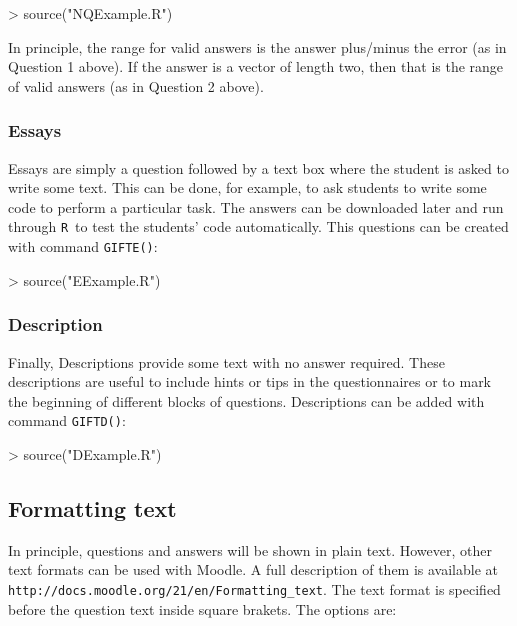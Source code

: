 \documentclass[a4paper]{article}
\newcommand{\RR}{\texttt{R}\ }
\newcommand{\code}[1]{\texttt{#1}}
\begin{document}

\begin{Schunk}
\begin{Sinput}
> source("NQExample.R")
\end{Sinput}
\end{Schunk}


In principle, the range for valid answers is the answer plus/minus the error
(as in Question 1 above).  If the answer is a vector of length two, then that
is the range of valid answers (as in Question 2 above).

\subsubsection{Essays}

Essays are simply a question followed by a text box where the student is asked
to write some text. This can be done, for example, to ask students to write
some code to perform a particular task.  The answers can be downloaded later
and run through \RR to test the students' code automatically. This questions can
be created with command \code{GIFTE()}:


\begin{Schunk}
\begin{Sinput}
> source("EExample.R")
\end{Sinput}
\end{Schunk}


\subsubsection{Description}

Finally, Descriptions provide some text with no answer required. These
descriptions are useful to include hints or tips in the questionnaires
or to mark the beginning of different blocks of questions. Descriptions
can be added with command \code{GIFTD()}:


\begin{Schunk}
\begin{Sinput}
> source("DExample.R")
\end{Sinput}
\end{Schunk}

\subsection{Formatting text}

In principle, questions and answers will be shown in plain text.
However, other text formats can be used with Moodle.
A full description of them is available at 
\verb+http://docs.moodle.org/21/en/Formatting_text+.
The text format is specified before the question text inside square
brakets. The options are:
\end{document}
